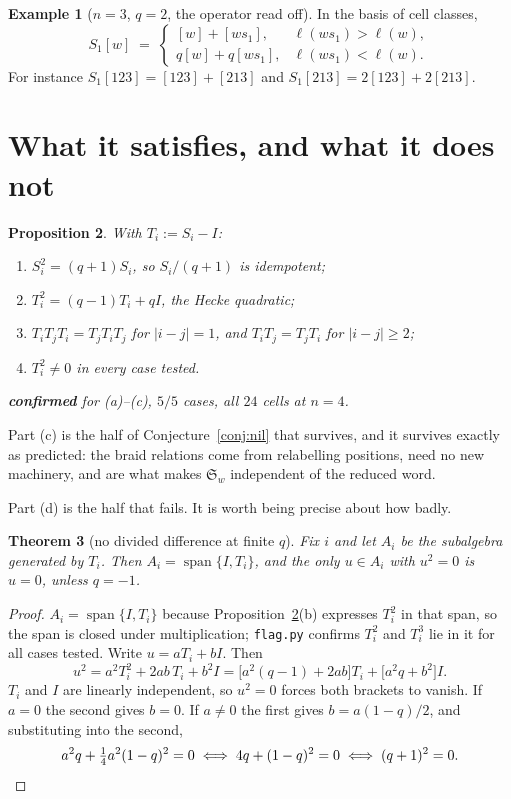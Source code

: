 \documentclass[11pt,a4paper]{article}
\newtheorem{theorem}{Theorem}[section]
\newtheorem{proposition}[theorem]{Proposition}
\theoremstyle{definition}
\newtheorem{example}[theorem]{Example}
\theoremstyle{remark}
\newcommand{\Schub}{\mathfrak{S}}
\newcommand{\OK}{\textcolor{okgreen}{\textbf{confirmed}}}
\begin{document}
\begin{example}[$n = 3$, $q = 2$, the operator read off]\label{ex:rule}
In the basis of cell classes,
\[
  S_1[w] \;=\;
  \begin{cases}
    [w] + [w s_1], & \ell(w s_1) > \ell(w),\\[0.2em]
    q[w] + q[w s_1], & \ell(w s_1) < \ell(w).
  \end{cases}
\]
For instance $S_1[123] = [123] + [213]$ and $S_1[213] = 2[123] + 2[213]$.
\end{example}

\section{What it satisfies, and what it does not}

\begin{proposition}\label{prop:rels}
With $T_i := S_i - I$:
\begin{enumerate}[nosep,label=(\alph*)]
\item $S_i^2 = (q+1) S_i$, so $S_i/(q+1)$ is idempotent;
\item $T_i^2 = (q-1) T_i + q I$, the Hecke quadratic;
\item $T_i T_j T_i = T_j T_i T_j$ for $|i - j| = 1$, and $T_i T_j = T_j T_i$ for
      $|i - j| \ge 2$;
\item $T_i^2 \ne 0$ in every case tested.
\end{enumerate}
\OK{} for (a)--(c), $5/5$ cases, all $24$ cells at $n = 4$.
\end{proposition}

Part (c) is the half of Conjecture~\ref{conj:nil} that survives, and it survives
exactly as predicted: the braid relations come from relabelling positions, need
no new machinery, and are what makes $\Schub_w$ independent of the reduced word.

Part (d) is the half that fails. It is worth being precise about how badly.

\begin{theorem}[no divided difference at finite $q$]\label{thm:nonil}
Fix $i$ and let $A_i$ be the subalgebra generated by $T_i$. Then
$A_i = \operatorname{span}\{I, T_i\}$, and the only $u \in A_i$ with $u^2 = 0$ is
$u = 0$, unless $q = -1$.
\end{theorem}

\begin{proof}
$A_i = \operatorname{span}\{I, T_i\}$ because Proposition~\ref{prop:rels}(b)
expresses $T_i^2$ in that span, so the span is closed under multiplication;
\texttt{flag.py} confirms $T_i^2$ and $T_i^3$ lie in it for all cases tested.
Write $u = aT_i + bI$. Then
\[
  u^2 = a^2 T_i^2 + 2ab\,T_i + b^2 I
      = \bigl[a^2(q-1) + 2ab\bigr] T_i + \bigl[a^2 q + b^2\bigr] I .
\]
$T_i$ and $I$ are linearly independent, so $u^2 = 0$ forces both brackets to
vanish. If $a = 0$ the second gives $b = 0$. If $a \ne 0$ the first gives
$b = a(1-q)/2$, and substituting into the second,
\[
  a^2 q + \tfrac{1}{4}a^2 (1-q)^2 = 0
  \;\Longleftrightarrow\;
  4q + (1-q)^2 = 0
  \;\Longleftrightarrow\;
  (q+1)^2 = 0 . \qedhere
\]
\end{proof}
\end{document}
